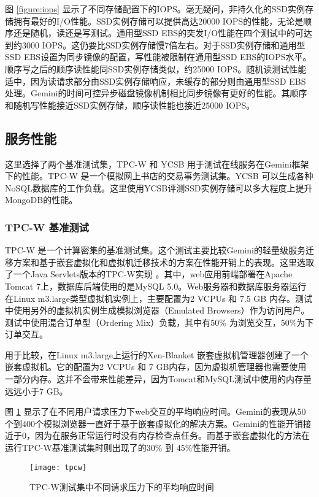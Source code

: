 图 \ref{figure:iops} 显示了不同存储配置下的IOPS。毫无疑问，非持久化的SSD实例存储拥有最好的I/O性能。SSD实例存储可以提供高达20000 IOPS的性能，无论是顺序还是随机，读还是写测试。通用型SSD EBS的突发I/O性能在四个测试中的可达到约3000 IOPS。这仍要比SSD实例存储慢7倍左右。对于SSD实例存储和通用型SSD EBS设置为同步镜像的配置，写性能被限制在通用型SSD EBS的IOPS水平。顺序写之后的顺序读性能同SSD实例存储类似，约25000 IOPS。随机读测试性能适中，因为读请求部分由SSD实例存储响应，未缓存的部分则由通用型SSD EBS处理。Gemini的时间可控异步磁盘镜像机制相比同步镜像有更好的性能。其顺序和随机写性能接近SSD实例存储，顺序读性能也接近25000 IOPS。

\subsection{服务性能}
这里选择了两个基准测试集，TPC-W 和 YCSB 用于测试在线服务在Gemini框架下的性能。TPC-W 是一个模拟网上书店的交易事务测试集。YCSB 可以生成各种NoSQL数据库的工作负载。这里使用YCSB评测SSD实例存储可以多大程度上提升MongoDB的性能。

\subsubsection{TPC-W 基准测试}
TPC-W 是一个计算密集的基准测试集。这个测试主要比较Gemini的轻量级服务迁移方案和基于嵌套虚拟化和虚拟机迁移技术的方案在性能开销上的表现。这里选取了一个Java Servlets版本的TPC-W实现 \cite{JAVATPCW:2014}。其中，web应用前端部署在Apache Tomcat 7上，数据库后端使用的是MySQL 5.0。Web服务器和数据库服务器运行在Linux m3.large类型虚拟机实例上，主要配置为2 VCPUs 和 7.5 GB 内存。测试中使用另外的虚拟机实例生成模拟浏览器（Emulated Browsers）作为访问用户。测试中使用混合订单型（Ordering Mix）负载，其中有50\% 为浏览交互，50\%为下订单交互。

用于比较，在Linux m3.large上运行的Xen-Blanket \cite{Williams:2012:XVO:2168836.2168849} 嵌套虚拟机管理器创建了一个嵌套虚拟机。它的配置为2 VCPUs 和 7 GB内存，因为虚拟机管理器也需要使用一部分内存。这并不会带来性能差异，因为Tomcat和MySQL测试中使用的内存量远远小于7 GB。

图 \ref{figure:tpcw} 显示了在不同用户请求压力下web交互的平均响应时间。Gemini的表现从50个到400个模拟浏览器一直好于基于嵌套虚拟化的解决方案。Gemini的性能开销接近于0，因为在服务正常运行时没有内存检查点任务。而基于嵌套虚拟化的方法在运行TPC-W基准测试集时则出现了的30\% 到 45\%性能开销。
\begin{figure}[]
  \centering
  \texttt{[image: tpcw]}
  \caption{TPC-W测试集中不同请求压力下的平均响应时间}
  \label{figure:tpcw}
\end{figure}

